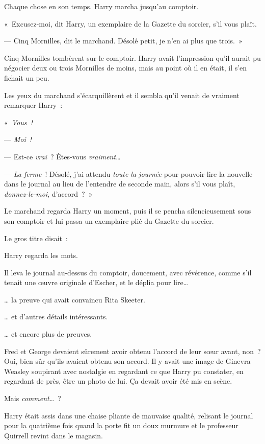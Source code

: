 Chaque chose en son temps.
Harry marcha jusqu'au comptoir.

«~Excusez-moi, dit Harry, un exemplaire de la Gazette du sorcier, s'il vous plaît.

--- Cinq Mornilles, dit le marchand.
Désolé petit, je n'en ai plus que trois.~»

Cinq Mornilles tombèrent sur le comptoir.
Harry avait l'impression qu'il aurait pu négocier deux ou trois Mornilles de moins, mais au point où il en était, il s'en fichait un peu.

Les yeux du marchand s'écarquillèrent et il sembla qu'il venait de vraiment remarquer Harry~:

«~\emph{Vous~!}

--- \emph{Moi~!}

--- Est-ce \emph{vrai}~?
Êtes-vous \emph{vraiment}…

--- \emph{La ferme}~!
Désolé, j'ai attendu \emph{toute la journée} pour pouvoir lire la nouvelle dans le journal au lieu de l'entendre de seconde main, alors s'il vous plaît, \emph{donnez-le-moi}, d'accord~?~»

Le marchand regarda Harry un moment, puis il se pencha silencieusement sous son comptoir et lui passa un exemplaire plié du Gazette du sorcier.

Le gros titre disait~:

Harry regarda les mots.

Il leva le journal au-dessus du comptoir, doucement, avec révérence, comme s'il tenait une œuvre originale d'Escher, et le déplia pour lire…

… la preuve qui avait convaincu Rita Skeeter.

… et d'autres détails intéressants.

… et encore plus de preuves.

Fred et George devaient sûrement avoir obtenu l'accord de leur sœur avant, non~?
Oui, bien sûr qu'ils avaient obtenu son accord.
Il y avait une image de Ginevra Weasley soupirant avec nostalgie en regardant ce que Harry pu constater, en regardant de près, être un photo de lui.
Ça devait avoir été mis en scène.

Mais \emph{comment…}~?

Harry était assis dans une chaise pliante de mauvaise qualité, relisant le journal pour la quatrième fois quand la porte fit un doux murmure et le professeur Quirrell revint dans le magasin.

